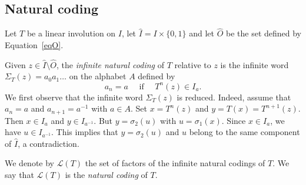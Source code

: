\documentclass[preprint,12pt]{elsarticle}
\newcommand\LL{\mathcal{L}}
\numberwithin{theorem}{section}
\numberwithin{equation}{section}
\numberwithin{figure}{section}
\numberwithin{table}{section}
\begin{document}
\subsection{Natural coding}
Let $T$ be a linear involution on $I$, let $\hat{I}=I\times\{0,1\}$ and let
$\hat{O}$ be the set defined by Equation~\eqref{eqO}.

Given $z\in \hat{I}\setminus \hat{O}$, the \emph{infinite natural
  coding} of $T$ relative to $z$ is the infinite word
$\Sigma_T(z)=a_0a_1\ldots$
on the alphabet $A$ defined by
\begin{displaymath}
a_n=a\quad\text{ if }\quad T^n(z)\in I_a.
\end{displaymath}
We first observe that the infinite word $\Sigma_T(z)$ is
reduced. Indeed, assume that $a_n=a$ and $a_{n+1}=a^{-1}$ with $a\in
A$. Set $x=T^n(z)$ and $y=T(x)=T^{n+1}(z)$. Then $x\in I_a$
and $y\in I_{a^{-1}}$. But $y=\sigma_2(u)$ with $u=\sigma_1(x)$. Since $x\in
I_a$, we have $u\in I_{a^{-1}}$. This implies that
$y=\sigma_2(u)$ and $u$ belong to the same component of $\hat{I}$, a contradiction.

We denote by $\LL(T)$ the set of factors of the infinite natural codings
of $T$. We say that $\LL(T)$ is 
the \emph{natural coding} of $T$. 
\end{document}

